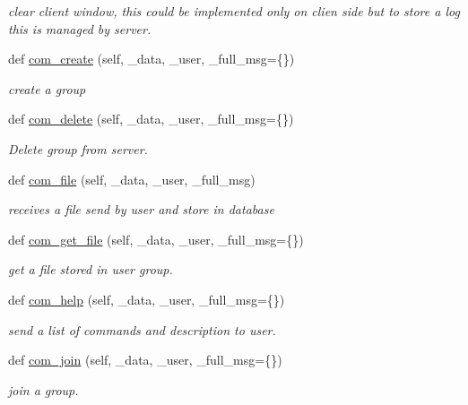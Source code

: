 \begin{DoxyCompactItemize}
\begin{DoxyCompactList}\small\item\em clear client window, this could be implemented only on clien side but to store a log this is managed by server. \end{DoxyCompactList}\item 
def \hyperlink{classlib_1_1server_1_1_server_aebcbb98a94de4a22a64a1ee111035076}{com\+\_\+create} (self, \+\_\+data, \+\_\+user, \+\_\+full\+\_\+msg=\{\})
\begin{DoxyCompactList}\small\item\em create a group \end{DoxyCompactList}\item 
def \hyperlink{classlib_1_1server_1_1_server_afa989eaf9afcba0862cec54e9cb35a3c}{com\+\_\+delete} (self, \+\_\+data, \+\_\+user, \+\_\+full\+\_\+msg=\{\})
\begin{DoxyCompactList}\small\item\em Delete group from server. \end{DoxyCompactList}\item 
def \hyperlink{classlib_1_1server_1_1_server_a094777e00032aedea3b32fb7a46a6781}{com\+\_\+file} (self, \+\_\+data, \+\_\+user, \+\_\+full\+\_\+msg)
\begin{DoxyCompactList}\small\item\em receives a file send by user and store in database \end{DoxyCompactList}\item 
def \hyperlink{classlib_1_1server_1_1_server_ae7d89f08e093e3fd65d9a6195abfc2f5}{com\+\_\+get\+\_\+file} (self, \+\_\+data, \+\_\+user, \+\_\+full\+\_\+msg=\{\})
\begin{DoxyCompactList}\small\item\em get a file stored in user group. \end{DoxyCompactList}\item 
def \hyperlink{classlib_1_1server_1_1_server_af7ebbd5cd66265307ac4f947b5342315}{com\+\_\+help} (self, \+\_\+data, \+\_\+user, \+\_\+full\+\_\+msg=\{\})
\begin{DoxyCompactList}\small\item\em send a list of commands and description to user. \end{DoxyCompactList}\item 
def \hyperlink{classlib_1_1server_1_1_server_a4cf5a269c6af4b838cd5c1ced1676662}{com\+\_\+join} (self, \+\_\+data, \+\_\+user, \+\_\+full\+\_\+msg=\{\})
\begin{DoxyCompactList}\small\item\em join a group. \end{DoxyCompactList}\item 

\end{DoxyCompactItemize}
